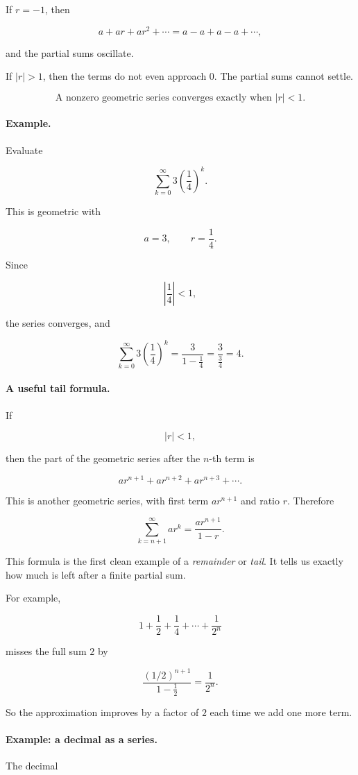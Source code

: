 If \(r=-1\), then

\[
a+ar+ar^2+\cdots=a-a+a-a+\cdots,
\]

and the partial sums oscillate.

If \(|r|>1\), then the terms do not even approach \(0\).  The partial sums cannot
settle.

\[
\boxed{
\text{A nonzero geometric series converges exactly when \(|r|<1\).}
}
\]

\paragraph{Example.}
Evaluate

\[
\sum_{k=0}^{\infty}3\left(\frac14\right)^k.
\]

This is geometric with

\[
a=3,
\qquad
r=\frac14.
\]

Since

\[
\left|\frac14\right|<1,
\]

the series converges, and

\[
\sum_{k=0}^{\infty}3\left(\frac14\right)^k
=
\frac{3}{1-\frac14}
=
\frac{3}{\frac34}
=
\boxed{4}.
\]

\paragraph{A useful tail formula.}
If

\[
|r|<1,
\]

then the part of the geometric series after the \(n\)-th term is

\[
ar^{n+1}+ar^{n+2}+ar^{n+3}+\cdots.
\]

This is another geometric series, with first term \(ar^{n+1}\) and ratio \(r\).  Therefore

\[
\boxed{
\sum_{k=n+1}^{\infty} ar^k
=
\frac{ar^{n+1}}{1-r}.
}
\]

This formula is the first clean example of a \emph{remainder} or \emph{tail}.  It tells us
exactly how much is left after a finite partial sum.

For example,

\[
1+\frac12+\frac14+\cdots+\frac1{2^n}
\]

misses the full sum \(2\) by

\[
\frac{(1/2)^{n+1}}{1-\frac12}
=
\frac1{2^n}.
\]

So the approximation improves by a factor of \(2\) each time we add one more term.

\paragraph{Example: a decimal as a series.}
The decimal

